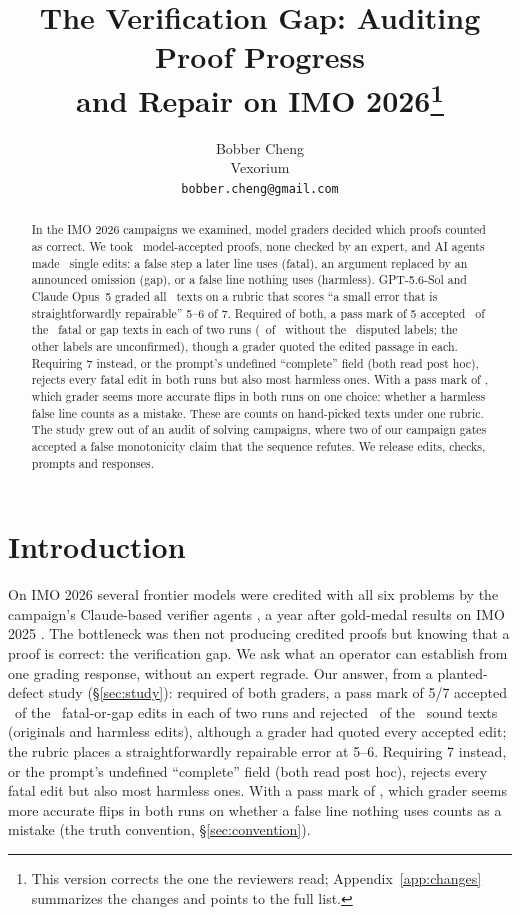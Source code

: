 \documentclass{article}
\title{The Verification Gap: Auditing Proof Progress\\and Repair on IMO 2026\thanks{This version corrects the one the reviewers read; Appendix~\ref{app:changes} summarizes the changes and points to the full list.}}
\author{%
  Bobber Cheng\\
  Vexorium\\
  \texttt{bobber.cheng@gmail.com}\\
}
\begin{document}
\maketitle

\begin{abstract}
In the IMO 2026 campaigns we examined, model graders decided which proofs counted as correct. We took \CRNBases\ model-accepted proofs, none checked by an expert, and AI agents made \CRNMutants\ single edits: a false step a later line uses (fatal), an argument replaced by an announced omission (gap), or a false line nothing uses (harmless). GPT-5.6-Sol and Claude Opus~5 graded all \CRNTexts\ texts on a rubric that scores ``a small error that is straightforwardly repairable'' 5--6 of 7. Required of both, a pass mark of 5 accepted \CRPassBrokenAccP\ of the \CRNBroken\ fatal or gap texts in each of two runs (\CRLadderPassFiveP\ of \CRLadderNFive\ without the \CRNDisputedWord\ disputed labels; the other labels are unconfirmed), though a grader quoted the edited passage in each. Requiring 7 instead, or the prompt's undefined ``complete'' field (both read post hoc), rejects every fatal edit in both runs but also most harmless ones. With a pass mark of , which grader seems more accurate flips in both runs on one choice: whether a harmless false line counts as a mistake. These are counts on hand-picked texts under one rubric. The study grew out of an audit of solving campaigns, where two of our campaign gates accepted a false monotonicity claim that the sequence  refutes. We release edits, checks, prompts and responses.
\end{abstract}

\section{Introduction}
\label{sec:intro}

On IMO 2026 several frontier models were credited with all six problems by the campaign's Claude-based verifier agents \citep{deedy2026imo}, a year after gold-medal results on IMO 2025 \citep{deepmind2025imo,openai2025imo,huang2025gold}. The bottleneck was then not producing credited proofs but knowing that a proof is correct: the verification gap. We ask what an operator can establish from one grading response, without an expert regrade. Our answer, from a planted-defect study (\S\ref{sec:study}): required of both graders, a pass mark of 5/7 accepted \CRPassBrokenAccP\ of the \CRNBroken\ fatal-or-gap edits in each of two runs and rejected \CRPassSoundRejP\ of the \CRNSound\ sound texts (originals and harmless edits), although a grader had quoted every accepted edit; the rubric places a straightforwardly repairable error at 5--6. Requiring 7 instead, or the prompt's undefined ``complete'' field (both read post hoc), rejects every fatal edit but also most harmless ones. With a pass mark of , which grader seems more accurate flips in both runs on whether a false line nothing uses counts as a mistake (the truth convention, \S\ref{sec:convention}).
\end{document}
